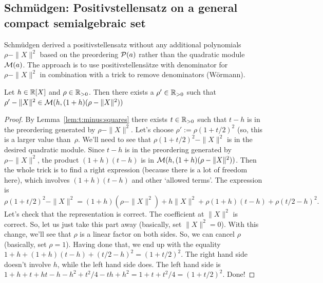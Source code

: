 \subsection{Schmüdgen: Positivstellensatz on a general compact semialgebraic set}

Schmüdgen derived a positivstellensatz without any additional polynomials $\rho - \|X\|^2$ based on the preordering $\mathcal{P}(a)$ rather than the quadratic module $\mathcal{M}(a)$. The approach is to use positivstellensätze with denominator for $\rho - \|X\|^2$ in combination with a trick to remove denominators (Wörmann). 

\begin{lemma}
	\label{lem:woer:trick}
	Let $h \in \mathbb{R}[X]$ and $\rho \in \mathbb{R}_{>0}$. Then there exists a $\rho' \in \mathbb{R}_{>0}$ such that $\rho' - \|X\|^2 \in \mathcal{M}(h, (1+h) ( \rho - \|X\|^2))$
\end{lemma}
\begin{proof}
	By Lemma~\ref{lem:t:minus:squares} there exists $t \in \mathbb{R}_{>0}$ such that $t- h$ is in the preordering generated by $\rho -\|X\|^2$. Let's choose $\rho' := \rho (1 + t/2)^2$ (so, this is a larger value than~$\rho$. We'll need to see that $\rho(1+ t/2)^2 - \|X\|^2$ is in the desired quadratic module. Since $t- h$ is in the preordering generated by $\rho -\|X\|^2$, the product $(1+h)(t-h)$ is in $\mathcal{M}(h,(1+h)(\rho-\|X\|^2))$. Then the whole trick is to find a right expression (because there is a lot of freedom here), which involves $(1+h)(t-h)$ and other `allowed terms'. The expression is 
	\[
		\rho (1+ t/2)^2 -\|X\|^2 = (1+h)(\rho - \|X\|^2) + h \|X\|^2 + \rho (1+h) (t-h) + \rho (t/2 -h)^2.
	\]
	Let's check that the representation is correct. The coefficient at  $\|X\|^2$ is correct. So, let us just take this part away (basically, set $\|X\|^2 = 0$). With this change, we'll see that $\rho$ is a linear factor on both sides. So, we can cancel $\rho$ (basically, set $\rho=1$). Having done that, we end up with the equality $1+ h + (1+h) (t-h) + (t/2-h)^2 = (1+t/2)^2$. The right hand side doesn't involve $h$, while the left hand side does. The left hand side is $1+ h + t + h t - h - h^2 + t^2/4 - t h + h^2 = 1 + t + t^2/4 = (1+t/2)^2$. Done!
\end{proof}

